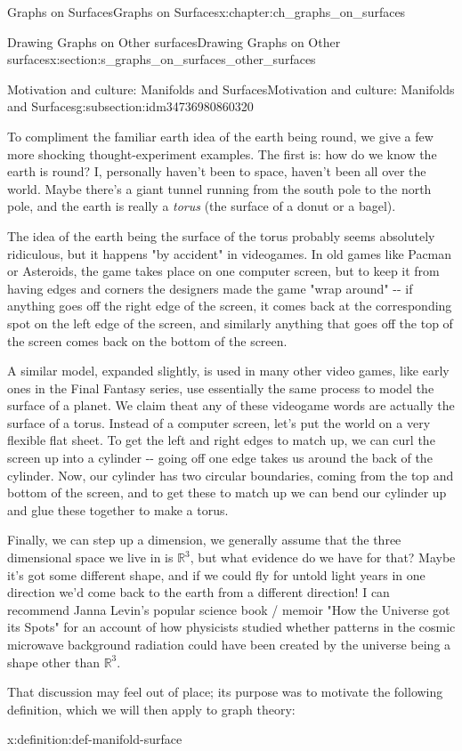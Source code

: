 \documentclass[oneside,10pt,]{book}
\numberwithin{equation}{section}
\newcommand{\reals}{\mathbb{R}}
\begin{document}
\begin{chapterptx}{Graphs on Surfaces}{}{Graphs on Surfaces}{}{}{x:chapter:ch_graphs_on_surfaces}
\begin{sectionptx}{Drawing Graphs on Other surfaces}{}{Drawing Graphs on Other surfaces}{}{}{x:section:s_graphs_on_surfaces_other_surfaces}
\begin{subsectionptx}{Motivation and culture: Manifolds and Surfaces}{}{Motivation and culture: Manifolds and Surfaces}{}{}{g:subsection:idm34736980860320}
\par
To compliment the familiar earth idea of the earth being round, we give a few more shocking thought-experiment examples.  The first is: how do we know the earth is round?  I, personally haven't been to space, haven't been all over the world.  Maybe there's a giant tunnel running from the south pole to the north pole, and the earth is really a \emph{torus} (the surface of a donut or a bagel).%
\par
The idea of the earth being the surface of the torus probably seems absolutely ridiculous, but it happens "by accident" in videogames.  In old games like Pacman or Asteroids, the game takes place on one computer screen, but to keep it from having edges and corners the designers made the game "wrap around" -{}-{} if anything goes off the right edge of the screen, it comes back at the corresponding spot on the left edge of the screen, and similarly anything that goes off the top of the screen comes back on the bottom of the screen.%
\par
A similar model, expanded slightly, is used in many other video games, like early ones in the Final Fantasy series, use essentially the same process to model the surface of a planet.  We claim theat any of these videogame words are actually the surface of a torus.  Instead of a computer screen, let's put the world on a very flexible flat sheet.  To get the left and right edges to match up, we can curl the screen up into a cylinder -{}-{} going off one edge takes us around the back of the cylinder.  Now, our cylinder has two circular boundaries, coming from the top and bottom of the screen, and to get these to match up we can bend our cylinder up and glue these together to make a torus.%
\par
Finally, we can step up a dimension, we generally assume that the three dimensional space we live in is \(\reals^3\), but what evidence do we have for that?  Maybe it's got some different shape, and if we could fly for untold light years in one direction we'd come back to the earth from a different direction!  I can recommend Janna Levin's popular science book \slash{} memoir "How the Universe got its Spots" for an account of how physicists studied whether patterns in the cosmic microwave background radiation could have been created by the universe being a shape other than \(\reals^3\).%
\par
That discussion may feel out of place; its purpose was to motivate the following definition, which we will then apply to graph theory:%
\begin{definition}{}{x:definition:def-manifold-surface}%

\end{definition}
\end{subsectionptx}
\end{sectionptx}
\end{chapterptx}
\end{document}
